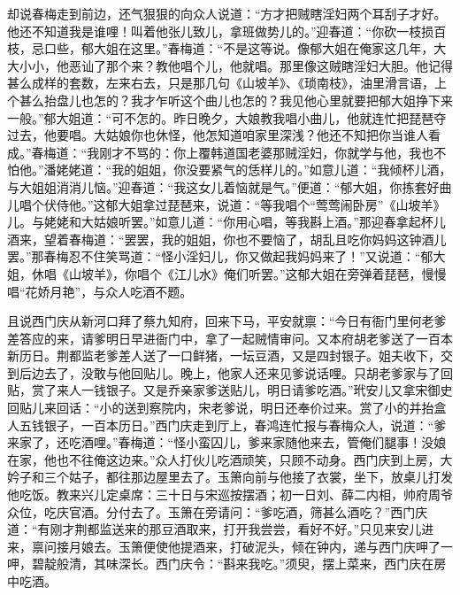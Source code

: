 却说春梅走到前边，还气狠狠的向众人说道：“方才把贼瞎淫妇两个耳刮子才好。他还不知道我是谁哩！叫着他张儿致儿，拿班做势儿的。”迎春道：“你砍一枝损百枝，忌口些，郁大姐在这里。”春梅道：“不是这等说。像郁大姐在俺家这几年，大大小小，他恶讪了那个来？教他唱个儿，他就唱。那里像这贼瞎淫妇大胆。他记得甚么成样的套数，左来右去，只是那几句《山坡羊》、《琐南枝》，油里滑言语，上个甚么抬盘儿也怎的？我才乍听这个曲儿也怎的？我见他心里就要把郁大姐挣下来一般。”郁大姐道：“可不怎的。昨日晚夕，大娘教我唱小曲儿，他就连忙把琵琶夺过去，他要唱。大姑娘你也休怪，他怎知道咱家里深浅？他还不知把你当谁人看成。”春梅道：“我刚才不骂的：你上覆韩道国老婆那贼淫妇，你就学与他，我也不怕他。”潘姥姥道：“我的姐姐，你没要紧气的恁样儿的。”如意儿道：“我倾杯儿酒，与大姐姐消消儿恼。”迎春道：“我这女儿着恼就是气。”便道：“郁大姐，你拣套好曲儿唱个伏侍他。”这郁大姐拿过琵琶来，说道：“等我唱个“莺莺闹卧房”《山坡羊》儿。与姥姥和大姑娘听罢。”如意儿道：“你用心唱，等我斟上酒。”那迎春拿起杯儿酒来，望着春梅道：“罢罢，我的姐姐，你也不要恼了，胡乱且吃你妈妈这钟酒儿罢。”那春梅忍不住笑骂道：“怪小淫妇儿，你又做起我妈妈来了！”又说道：“郁大姐，休唱《山坡羊》，你唱个《江儿水》俺们听罢。”这郁大姐在旁弹着琵琶，慢慢唱“花娇月艳”，与众人吃酒不题。

且说西门庆从新河口拜了蔡九知府，回来下马，平安就禀：“今日有衙门里何老爹差答应的来，请爹明日早进衙门中，拿了一起贼情审问。又本府胡老爹送了一百本新历日。荆都监老爹差人送了一口鲜猪，一坛豆酒，又是四封银子。姐夫收下，交到后边去了，没敢与他回贴儿。晚上，他家人还来见爹说话哩。只胡老爹家与了回贴，赏了来人一钱银子。又是乔亲家爹送贴儿，明日请爹吃酒。”玳安儿又拿宋御史回贴儿来回话：“小的送到察院内，宋老爹说，明日还奉价过来。赏了小的并抬盒人五钱银子，一百本历日。”西门庆走到厅上，春鸿连忙报与春梅众人，说道：“爹来家了，还吃酒哩。”春梅道：“怪小蛮囚儿，爹来家随他来去，管俺们腿事！没娘在家，他也不往俺这边来。”众人打伙儿吃酒顽笑，只顾不动身。西门庆到上房，大妗子和三个姑子，都往那边屋里去了。玉箫向前与他接了衣裳，坐下，放桌儿打发他吃饭。教来兴儿定桌席：三十日与宋巡按摆酒；初一日刘、薛二内相，帅府周爷众位，吃庆官酒。分付去了。玉箫在旁请问：“爹吃酒，筛甚么酒吃？”西门庆道：“有刚才荆都监送来的那豆酒取来，打开我尝尝，看好不好。”只见来安儿进来，禀问接月娘去。玉箫便使他提酒来，打破泥头，倾在钟内，递与西门庆呷了一呷，碧靛般清，其味深长。西门庆令：“斟来我吃。”须臾，摆上菜来，西门庆在房中吃酒。

